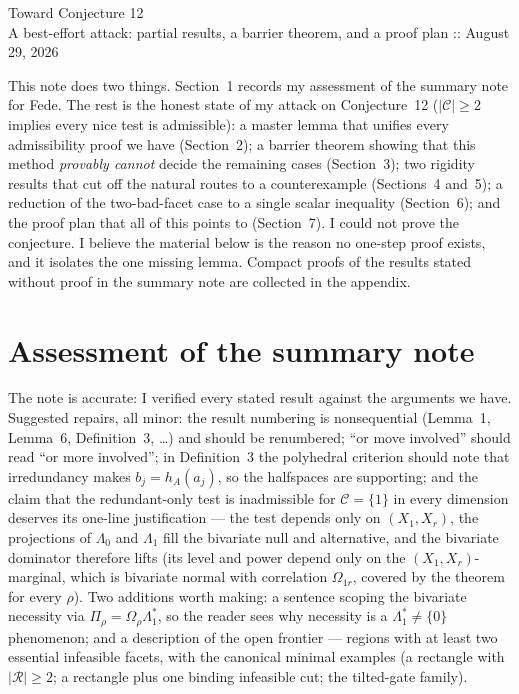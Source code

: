 \documentclass[12pt]{article}
\theoremstyle{remark}
\newcommand{\cC}{\mathcal C}
\newcommand{\cR}{\mathcal R}
\begin{document}
\begin{center}
{\Large Toward Conjecture 12}\\[3pt]
{\small A best-effort attack: partial results, a barrier theorem, and a proof
plan :: August 29, 2026}
\end{center}

\medskip

This note does two things. Section~1 records my assessment of the summary
note for Fede. The rest is the honest state of my attack on Conjecture~12
($|\cC|\ge2$ implies every nice test is admissible): a master lemma that
unifies every admissibility proof we have (Section~2); a barrier theorem
showing that this method \emph{provably cannot} decide the remaining cases
(Section~3); two rigidity results that cut off the natural routes to a
counterexample (Sections~4 and~5); a reduction of the two-bad-facet case to
a single scalar inequality (Section~6); and the proof plan that all of this
points to (Section~7). I could not prove the conjecture. I believe the
material below is the reason no one-step proof exists, and it isolates the
one missing lemma. Compact proofs of the results stated without proof in the
summary note are collected in the appendix.

\section{Assessment of the summary note}

The note is accurate: I verified every stated result against the arguments
we have. Suggested repairs, all minor: the result numbering is
nonsequential (Lemma~1, Lemma~6, Definition~3, \dots) and should be
renumbered; ``or move involved'' should read ``or more involved''; in
Definition~3 the polyhedral criterion should note that irredundancy makes
$b_j=h_A(a_j)$, so the halfspaces are supporting; and the claim that the
redundant-only test is inadmissible for $\cC=\{1\}$ in every dimension
deserves its one-line justification --- the test depends only on
$(X_1,X_r)$, the projections of $\Lambda_0$ and $\Lambda_1$ fill the
bivariate null and alternative, and the bivariate dominator therefore lifts
(its level and power depend only on the $(X_1,X_r)$-marginal, which is
bivariate normal with correlation $\Omega_{1r}$, covered by the theorem for
every $\rho$). Two additions worth making: a sentence scoping the bivariate
necessity via $\Pi_\rho=\Omega_\rho\Lambda_1^*$, so the reader sees why
necessity is a $\Lambda_1^*\neq\{0\}$ phenomenon; and a description of the
open frontier --- regions with at least two essential infeasible facets,
with the canonical minimal examples (a rectangle with $|\cR|\ge2$; a
rectangle plus one binding infeasible cut; the tilted-gate family).
\end{document}
